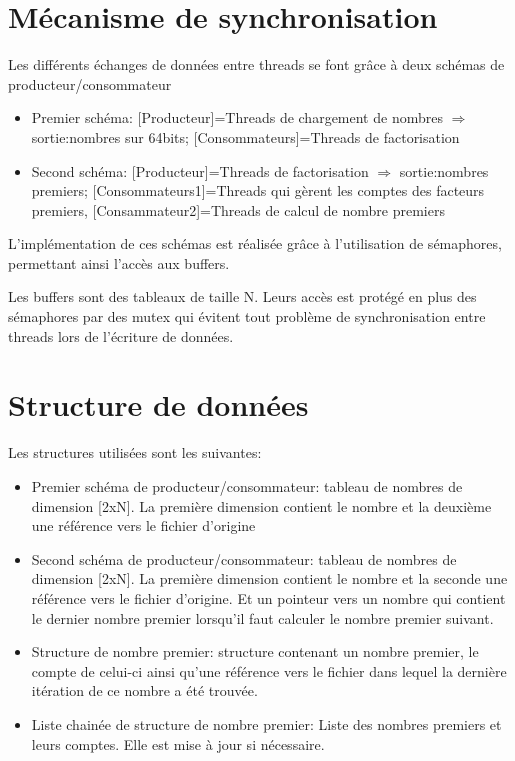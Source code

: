 \documentclass[11pt,a4paper]{article}
\begin{document}
\section*{Mécanisme de synchronisation}
Les différents échanges de données entre threads se font grâce à deux schémas de producteur/consommateur 

\begin{itemize}
\item{Premier schéma: [Producteur]=Threads de chargement de nombres $\Rightarrow$ sortie:nombres sur 64bits; [Consommateurs]=Threads de factorisation}
\item{Second schéma: [Producteur]=Threads de factorisation $\Rightarrow$ sortie:nombres premiers; [Consommateurs1]=Threads qui gèrent les comptes des facteurs premiers, [Consammateur2]=Threads de calcul de nombre premiers}
\end{itemize}

L'implémentation de ces schémas est réalisée grâce à l'utilisation de sémaphores, permettant ainsi l'accès aux buffers.

Les buffers sont des tableaux de taille N. Leurs accès est protégé en plus des sémaphores par des mutex qui évitent tout problème de synchronisation entre threads lors de l'écriture de données.

\section*{Structure de données}
Les structures utilisées sont les suivantes:

\begin{itemize}
\item{Premier schéma de producteur/consommateur: tableau de nombres de dimension [2xN]. La première dimension contient le nombre et la deuxième une référence vers le fichier d'origine}
\item{Second schéma de producteur/consommateur: tableau de nombres de dimension [2xN]. La première dimension contient le nombre et la seconde une référence vers le fichier d'origine. Et un pointeur vers un nombre qui contient le dernier nombre premier lorsqu'il faut calculer le nombre premier suivant.}
\item{Structure de nombre premier: structure contenant un nombre premier, le compte de celui-ci ainsi qu'une référence vers le fichier dans lequel la dernière itération de ce nombre a été trouvée.}
\item{Liste chainée de structure de nombre premier: Liste des nombres premiers et leurs comptes. Elle est mise à jour si nécessaire.}
\end{itemize}
\end{document}

